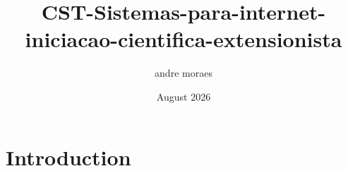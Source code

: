 \documentclass{article}
\title{CST-Sistemas-para-internet-iniciacao-cientifica-extensionista}
\author{andre moraes}
\date{August 2026}
\begin{document}
\maketitle

\section{Introduction}
\end{document}
